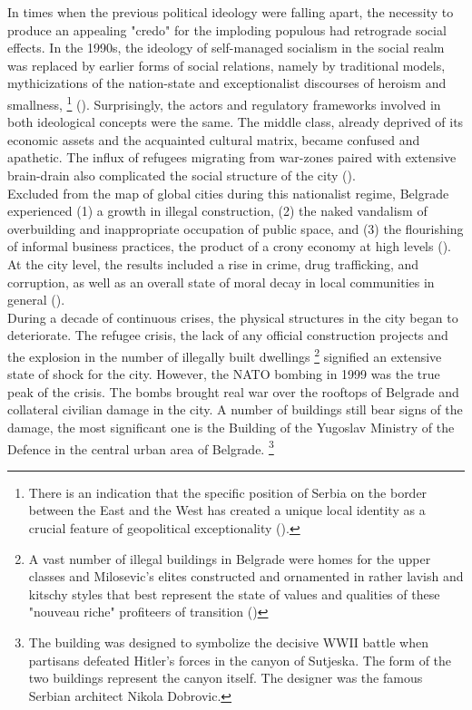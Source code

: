 \documentclass[11pt]{report}
\begin{document}
{{{{In times when the previous political ideology were falling apart, the necessity to produce an appealing "credo" for the imploding populous had retrograde social effects. In the 1990s, the ideology of self-managed socialism in the social realm was replaced by earlier forms of social relations, namely by traditional models, mythicizations of the nation-state and exceptionalist discourses of heroism and smallness,
\footnote{There is an indication that the specific position of Serbia on the border between the East and the West has created a unique local identity as a crucial feature of geopolitical exceptionality (\href{Savic}{\citealt{savic_where_2014}}).}
(\href{Doytchinov}{\citealt{doytchinov_belgrade_2015}}). 
Surprisingly, the actors and regulatory frameworks involved in both ideological concepts were the same.
The middle class, already deprived of its economic assets and the acquainted cultural matrix, became confused and apathetic.
The influx of refugees migrating from war-zones paired with extensive brain-drain also complicated the social structure of the city (\href{Doytchinov}{\citealt{doytchinov_urban_2015}}).
\\

Excluded from the map of global cities during this nationalist regime, Belgrade experienced (1) a growth in illegal construction, (2) the naked vandalism of overbuilding and inappropriate occupation of public space, and (3) the flourishing of informal business practices, the product of a crony economy at high levels (\href{Norris}{\citealt{norris_belgrade_2008}}).
At the city level, the results included a rise in crime, drug trafficking, and corruption, as well as an overall state of moral decay in local communities in general  (\href{Prodanovic}{\citealt{prodanovic_stariji_2004}}).
\\

During a decade of continuous crises, the physical structures in the city began to deteriorate.
The refugee crisis, the lack of any official construction projects and the explosion in the number of illegally built dwellings
\footnote{A vast number of illegal buildings in Belgrade were homes for the upper classes and Milosevic's elites constructed and ornamented in rather lavish and kitschy styles that best represent the state of values and qualities of these "nouveau riche" profiteers of transition (\href{Hirt}{\citealt{hirt_belgrade_2009}})}
signified an extensive state of shock for the city.
However, the NATO bombing in 1999 was the true peak of the crisis. The bombs brought real war over the rooftops of Belgrade and collateral civilian damage in the city. A number of buildings still bear signs of the damage, the most significant one is the Building of the Yugoslav Ministry of the Defence in the central urban area of Belgrade. 
\footnote{The building was designed to symbolize the decisive WWII battle when partisans defeated Hitler’s forces in the canyon of Sutjeska. The form of the two buildings represent the canyon itself. The designer was the famous Serbian architect Nikola Dobrovic.}
\\

}}}}
\end{document}
